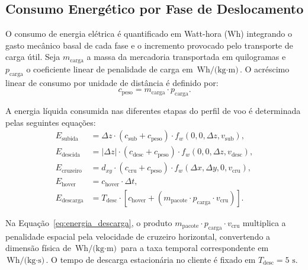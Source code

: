 \subsection{Consumo Energético por Fase de Deslocamento}

O consumo de energia elétrica é quantificado em Watt-hora ($\text{Wh}$) integrando o gasto mecânico basal de cada fase e o incremento provocado pelo transporte de carga útil. Seja $m_{\text{carga}}$ a massa da mercadoria transportada em quilogramas e $p_{\text{carga}}$ o coeficiente linear de penalidade de carga em $\text{Wh/(kg}\cdot\text{m)}$. O acréscimo linear de consumo por unidade de distância é definido por:
\begin{equation}\label{eq:c_peso}
c_{\text{peso}} = m_{\text{carga}} \cdot p_{\text{carga}}.
\end{equation}

A energia líquida consumida nas diferentes etapas do perfil de voo é determinada pelas seguintes equações:
\begin{align}
E_{\text{subida}} &= \Delta z \cdot (c_{\text{sub}} + c_{\text{peso}}) \cdot f_w(0, 0, \Delta z, v_{\text{sub}}), \label{eq:energia_subida} \\
E_{\text{descida}} &= |\Delta z| \cdot (c_{\text{desc}} + c_{\text{peso}}) \cdot f_w(0, 0, \Delta z, v_{\text{desc}}), \label{eq:energia_descida} \\
E_{\text{cruzeiro}} &= d_{xy} \cdot (c_{\text{cru}} + c_{\text{peso}}) \cdot f_w(\Delta x, \Delta y, 0, v_{\text{cru}}), \label{eq:energia_cruzeiro} \\
E_{\text{hover}} &= c_{\text{hover}} \cdot \Delta t, \label{eq:energia_hover} \\
E_{\text{descarga}} &= T_{\text{desc}} \cdot \left[ c_{\text{hover}} + (m_{\text{pacote}} \cdot p_{\text{carga}} \cdot v_{\text{cru}}) \right]. \label{eq:energia_descarga}
\end{align}

Na Equação~\eqref{eq:energia_descarga}, o produto $m_{\text{pacote}} \cdot p_{\text{carga}} \cdot v_{\text{cru}}$ multiplica a penalidade espacial pela velocidade de cruzeiro horizontal, convertendo a dimensão física de $\text{Wh/(kg}\cdot\text{m)}$ para a taxa temporal correspondente em $\text{Wh/(kg}\cdot\text{s)}$. O tempo de descarga estacionária no cliente é fixado em $T_{\text{desc}} = 5\text{ s}$.

